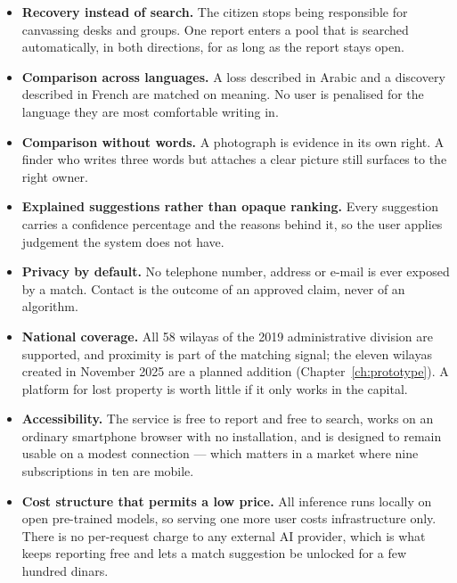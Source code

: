 \begin{itemize}[leftmargin=1.4em,itemsep=5pt]
  \item \textbf{Recovery instead of search.} The citizen stops being responsible
        for canvassing desks and groups. One report enters a pool that is
        searched automatically, in both directions, for as long as the report
        stays open.

  \item \textbf{Comparison across languages.} A loss described in Arabic and a
        discovery described in French are matched on meaning. No user is
        penalised for the language they are most comfortable writing in.

  \item \textbf{Comparison without words.} A photograph is evidence in its own
        right. A finder who writes three words but attaches a clear picture
        still surfaces to the right owner.

  \item \textbf{Explained suggestions rather than opaque ranking.} Every
        suggestion carries a confidence percentage and the reasons behind it, so
        the user applies judgement the system does not have.

  \item \textbf{Privacy by default.} No telephone number, address or e-mail is
        ever exposed by a match. Contact is the outcome of an approved claim,
        never of an algorithm.

  \item \textbf{National coverage.} All 58 wilayas of the 2019 administrative
        division are supported, and proximity is part of the matching signal;
        the eleven wilayas created in November 2025 are a planned addition
        (Chapter~\ref{ch:prototype}). A platform for lost property is worth
        little if it only works in the capital.

  \item \textbf{Accessibility.} The service is free to report and free to
        search, works on an ordinary smartphone browser with no installation,
        and is designed to remain usable on a modest connection --- which
        matters in a market where nine subscriptions in ten are mobile.

  \item \textbf{Cost structure that permits a low price.} All inference runs
        locally on open pre-trained models, so serving one more user costs
        infrastructure only. There is no per-request charge to any external AI
        provider, which is what keeps reporting free and lets a match
        suggestion be unlocked for a few hundred dinars.
\end{itemize}

